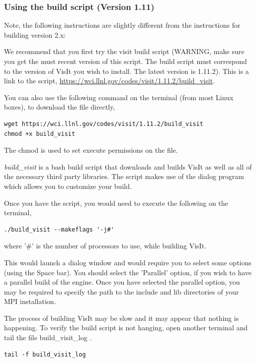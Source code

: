 \documentclass[12pt]{article}
\begin{document}
\subsubsection{Using the build script (Version 1.11) }
\label{subsec:UsingTheBuildScript}

Note, the following instructions are slightly different from the instructions
for building version 2.x:

We recommend that you first try the visit build script (WARNING, make
sure you get the must recent version of this script. The build script
must correspond to the version of VisIt you wish to install. The
latest version is 1.11.2). This is a link to the script,
\url{https://wci.llnl.gov/codes/visit/1.11.2/build\_visit}.

You can also use the following command on the terminal (from most
Linux boxes), to download the file directly,

\begin{verbatim}
wget https://wci.llnl.gov/codes/visit/1.11.2/build_visit
chmod +x build_visit
\end{verbatim}
The chmod is used to set execute permissions on the file.

\emph{build\_visit} is a bash build script that downloads and builds VisIt as
well as all of the necessary third party libraries. The script makes
use of the dialog program which allows you to customize your build.

Once you have the script, you would need to execute the following on
the terminal,

\begin{verbatim}
./build_visit --makeflags '-j#'
\end{verbatim}
where '\#' is the number of processors to use, while building VisIt.

This would launch a dialog window and would require you to select some
options (using the Space bar). You should select the 'Parallel'
option, if you wish to have a parallel build of the engine. Once you
have selected the parallel option, you may be required to specify the
path to the include and lib directories of your MPI installation.

The process of building VisIt may be slow and it may appear that
nothing is happening. To verify the build script is not hanging, open
another terminal and tail the file build\_visit\_log .

\begin{verbatim}
tail -f build_visit_log
\end{verbatim}
\end{document}
